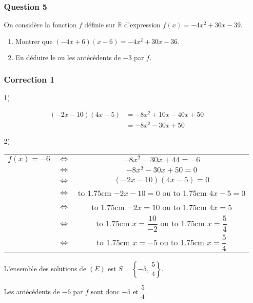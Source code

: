 \documentclass[15pt, mathserif]{beamer}
\begin{document}
\begin{frame} 
	\frametitle{Question 5}
On considère la fonction $f$ définie sur $\mathbb{R}$ d'expression $f(x) = -4x^{2}+30x-39$.

\begin{enumerate}
\item
	Montrer que $(-4x+6)(x-6)=-4x^{2}+30x-36$.
	\item En déduire le ou les antécédents de $-3$ par $f$.
\end{enumerate}


\end{frame}


\begin{frame}
\vspace{-10mm}
	\frametitle{Correction 1}
1)

\begin{align*}(-2x-10)(4x-5)&=-8x^{2}+10x-40x+50\\
	&=-8x^{2}-30x+50\end{align*}
\end{frame}

\begin{frame}
\vspace*{2em}2) 

 	\begin{tabular}{ccc} $f(x) = -6$ & $\Leftrightarrow$ & $-8x^{2}-30x+44=-6$  \\
		& $\Leftrightarrow$ & $-8x^{2}-30x+50=0$  \\
		& $\Leftrightarrow$ &  $(-2x-10)(4x-5)=0$  \quad \text{D'après 1)}\\
		& $\Leftrightarrow$ &  \hbox to 1.75cm {\hfill $-2x-10= 0$\hfill} \quad  ou \quad  \hbox to 1.75cm {\hfill $4x-5=0$\hfill} \\
		 & $\Leftrightarrow$ & \hbox to 1.75cm {\hfill $-2x = 10$\hfill} \quad  ou \quad \hbox to 1.75cm {\hfill $4x = 5$\hfill} \\[1.5ex]
		 & $\Leftrightarrow$ & \hbox to 1.75cm {\hfill $x= \dfrac{10}{-2}$\hfill} \quad  ou \quad \hbox to 1.75cm {\hfill $x= \dfrac{5}{4}$\hfill} \\[2.5ex]
		 & $\Leftrightarrow$ & \hbox to 1.75cm {\hfill $x = -5$\hfill} \quad  ou \quad \hbox to 1.75cm {\hfill $x = \dfrac{5}{4}$\hfill}
	\end{tabular}

\bigskip

L'ensemble des solutions de $(E)$ est $S=\left\{-5,~\dfrac{5}{4}\right\}$.

Les antécédents de $-6$ par $f$ sont donc $-5$ et $\dfrac{5}{4}$.\end{frame}
\end{document}

